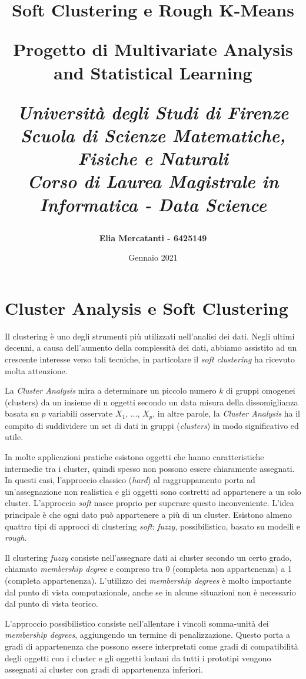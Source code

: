 \documentclass[12pt]{article}
\title{\textbf{\huge{Soft Clustering e Rough K-Means} \newline}
	
	\large{Progetto di Multivariate Analysis
	and Statistical Learning} \newline
	
	\large\textit{{Università degli Studi di Firenze\\
		Scuola di Scienze Matematiche, Fisiche e Naturali\\
		Corso di Laurea Magistrale in Informatica - Data Science}}
}
\author{\textbf{Elia Mercatanti - 6425149}}
\date{Gennaio 2021}
\begin{document}
\maketitle

\newpage

\section{Cluster Analysis e Soft Clustering}

Il clustering è uno degli strumenti più utilizzati nell'analisi dei dati. Negli ultimi decenni, a causa dell'aumento della complessità dei dati, abbiamo assistito ad un crescente interesse verso tali tecniche, in particolare il \textit{soft clustering} ha ricevuto molta attenzione.

La \textit{Cluster Analysis} mira a determinare un piccolo numero $k$ di gruppi omogenei (clusters) da un insieme di n oggetti secondo un data misura della dissomiglianza basata su $p$ variabili osservate $X_1$, $\dots$, $X_p$, in altre parole, la \textit{Cluster Analysis} ha il compito di suddividere un set di dati in gruppi (\textit{clusters}) in modo significativo ed utile.

In molte applicazioni pratiche esistono oggetti che hanno caratteristiche intermedie tra i cluster, quindi spesso non possono essere chiaramente assegnati. In questi casi, l'approccio classico (\textit{hard}) al raggruppamento porta ad un'assegnazione non realistica e gli oggetti sono costretti ad appartenere a un solo cluster. L'approccio \textit{soft} nasce proprio per superare questo inconveniente. L'idea principale è che ogni dato può appartenere a più di un cluster. Esistono almeno quattro tipi di approcci di clustering \textit{soft}: \textit{fuzzy}, possibilistico, basato su modelli e \textit{rough}.

Il clustering \textit{fuzzy} consiste nell'assegnare dati ai cluster secondo un certo grado, chiamato \textit{membership degree} e compreso tra 0 (completa non appartenenza) a 1 (completa appartenenza). L'utilizzo dei \textit{membership degrees} è molto importante dal punto di vista computazionale, anche se in alcune situazioni non è necessario dal punto di vista teorico.

L'approccio possibilistico consiste nell'allentare i vincoli somma-unità dei \textit{membership degrees}, aggiungendo un termine di penalizzazione. Questo porta a gradi di appartenenza che possono essere interpretati come gradi di compatibilità degli oggetti con i cluster e gli oggetti lontani da tutti i prototipi vengono assegnati ai cluster con gradi di appartenenza inferiori.
\end{document}
